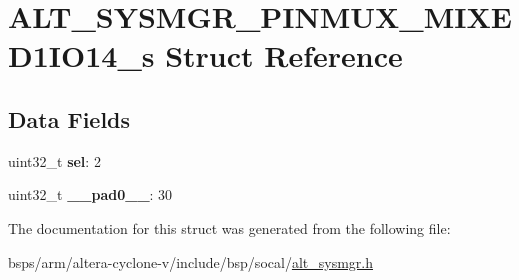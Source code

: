 \hypertarget{structALT__SYSMGR__PINMUX__MIXED1IO14__s}{}\section{A\+L\+T\+\_\+\+S\+Y\+S\+M\+G\+R\+\_\+\+P\+I\+N\+M\+U\+X\+\_\+\+M\+I\+X\+E\+D1\+I\+O14\+\_\+s Struct Reference}
\label{structALT__SYSMGR__PINMUX__MIXED1IO14__s}
\subsection*{Data Fields}
\begin{DoxyCompactItemize}
\item 
\mbox{\label{structALT__SYSMGR__PINMUX__MIXED1IO14__s_a8570b9651e752eadeb93dddbb031a6b2}} 
uint32\+\_\+t {\bfseries sel}\+: 2
\item 
\mbox{\label{structALT__SYSMGR__PINMUX__MIXED1IO14__s_aed00ab141571831298d7eeca5b039265}} 
uint32\+\_\+t {\bfseries \+\_\+\+\_\+pad0\+\_\+\+\_\+}\+: 30
\end{DoxyCompactItemize}


The documentation for this struct was generated from the following file\+:\begin{DoxyCompactItemize}
\item 
bsps/arm/altera-\/cyclone-\/v/include/bsp/socal/\mbox{\hyperlink{alt__sysmgr_8h}{alt\+\_\+sysmgr.\+h}}\end{DoxyCompactItemize}
